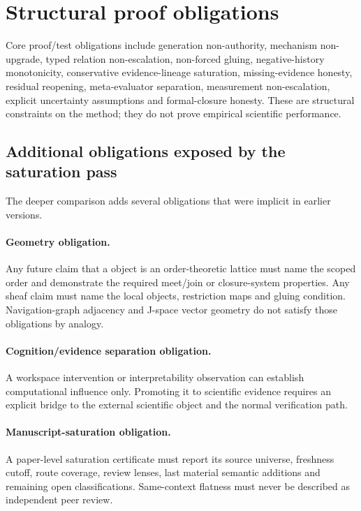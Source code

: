 \section{Structural proof obligations}
Core proof/test obligations include generation non-authority, mechanism non-upgrade, typed relation non-escalation, non-forced gluing, negative-history monotonicity, conservative evidence-lineage saturation, missing-evidence honesty, residual reopening, meta-evaluator separation, measurement non-escalation, explicit uncertainty assumptions and formal-closure honesty. These are structural constraints on the method; they do not prove empirical scientific performance.

\begingroup
\small
\setlength{\emergencystretch}{3em}
\subsection{Additional obligations exposed by the saturation pass}

The deeper comparison adds several obligations that were implicit in earlier versions.

\paragraph{Geometry obligation.}
Any future claim that a \RAKL{} object is an order-theoretic lattice must name the scoped order and demonstrate the required meet/join or closure-system properties. Any sheaf claim must name the local objects, restriction maps and gluing condition. Navigation-graph adjacency and J-space vector geometry do not satisfy those obligations by analogy.

\paragraph{Cognition/evidence separation obligation.}
A workspace intervention or interpretability observation can establish computational influence only. Promoting it to scientific evidence requires an explicit bridge to the external scientific object and the normal verification path.

\paragraph{Manuscript-saturation obligation.}
A paper-level saturation certificate must report its source universe, freshness cutoff, route coverage, review lenses, last material semantic additions and remaining open classifications. Same-context flatness must never be described as independent peer review.

